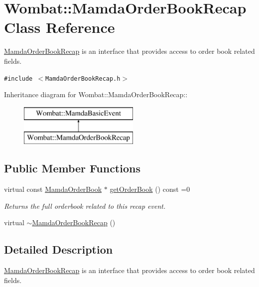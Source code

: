 \hypertarget{classWombat_1_1MamdaOrderBookRecap}{
\section{Wombat::Mamda\-Order\-Book\-Recap Class Reference}
\label{classWombat_1_1MamdaOrderBookRecap}
}
\hyperlink{classWombat_1_1MamdaOrderBookRecap}{Mamda\-Order\-Book\-Recap} is an interface that provides access to order book related fields.  


{\tt \#include $<$Mamda\-Order\-Book\-Recap.h$>$}

Inheritance diagram for Wombat::Mamda\-Order\-Book\-Recap::\begin{figure}[H]
\begin{center}
\leavevmode
\includegraphics[height=2cm]{classWombat_1_1MamdaOrderBookRecap}
\end{center}
\end{figure}
\subsection*{Public Member Functions}
\begin{CompactItemize}
\item 
virtual const \hyperlink{classWombat_1_1MamdaOrderBook}{Mamda\-Order\-Book} $\ast$ \hyperlink{classWombat_1_1MamdaOrderBookRecap_86f79018ef168c3f294fb00d5e657c72}{get\-Order\-Book} () const =0
\begin{CompactList}\small\item\em Returns the full orderbook related to this recap event. \item\end{CompactList}\item 
virtual \hyperlink{classWombat_1_1MamdaOrderBookRecap_dbadd91fd70b7f9bbdc337691055aeb2}{$\sim$Mamda\-Order\-Book\-Recap} ()
\end{CompactItemize}


\subsection{Detailed Description}
\hyperlink{classWombat_1_1MamdaOrderBookRecap}{Mamda\-Order\-Book\-Recap} is an interface that provides access to order book related fields. 



